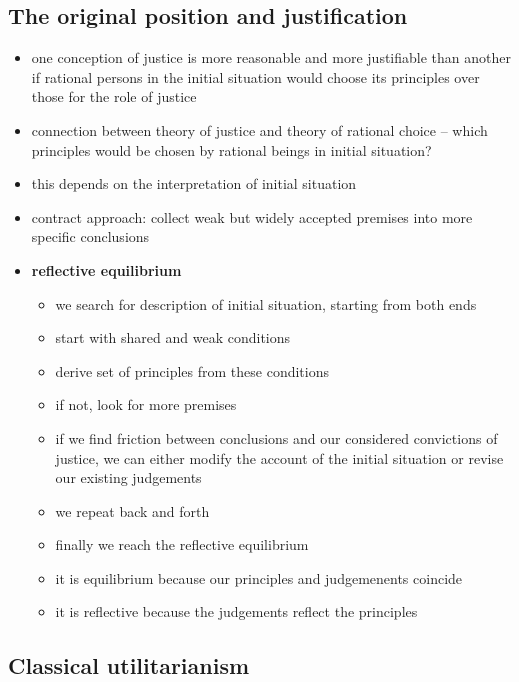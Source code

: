 \subsection{The original position and justification}
\begin{itemize}
	\item one conception of justice is more reasonable and more justifiable
	than another if rational persons in the initial situation would choose
	its principles over those for the role of justice
	\item connection between theory of justice and theory of rational
	choice -- which principles would be chosen by rational beings in
	initial situation?
	\item this depends on the interpretation of initial situation
	\item contract approach: collect weak but widely accepted premises into
	more specific conclusions
	\item \textbf{reflective equilibrium}
	\begin{itemize}
		\item we search for description of initial situation, starting
		from both ends
		\item start with shared and weak conditions
		\item derive set of principles from these conditions
		\item if not, look for more premises
		\item if we find friction between conclusions and our
		considered convictions of justice, we can either modify the
		account of the initial situation or revise our existing
		judgements
		\item we repeat back and forth
		\item finally we reach the reflective equilibrium
		\item it is equilibrium because our principles and judgemenents
		coincide
		\item it is reflective because the judgements reflect the
		principles
	\end{itemize}
\end{itemize}

\subsection{Classical utilitarianism}

